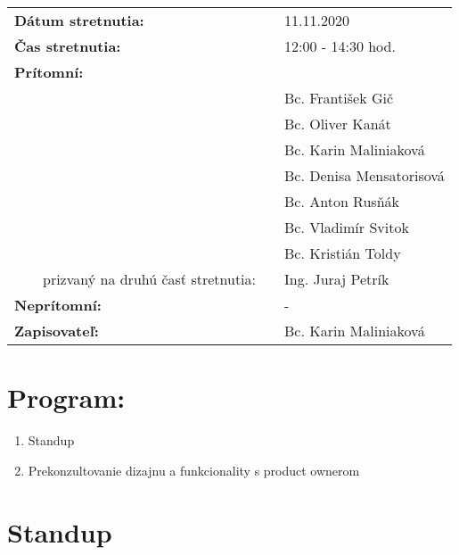 \documentclass{article}
\begin{document}
    

    \begin{table}[h]
        \begin{tabular}{lllll}
            \multicolumn{3}{l}{\textbf{Dátum stretnutia:}} & & 11.11.2020 \\
            \multicolumn{3}{l}{\textbf{Čas stretnutia:}} & & 12:00 - 14:30 hod. \\
            \multicolumn{3}{l}{\textbf{Prítomní:}} \\
            & & & & Bc. František Gič  \\
            & & & & Bc. Oliver Kanát \\
            & & & & Bc. Karin Maliniaková \\
            & & & & Bc. Denisa Mensatorisová \\
            & & & & Bc. Anton Rusňák \\
            & & & & Bc. Vladimír Svitok \\
            & & & & Bc. Kristián Toldy \\
            & & prizvaný na druhú časť stretnutia: & & Ing. Juraj Petrík \\
            \multicolumn{3}{l}{\textbf{Neprítomní:}} & & -\\
            \multicolumn{3}{l}{\textbf{Zapisovateľ:}} & & Bc. Karin Maliniaková \\
        \end{tabular}
        \label{tab:grades}
    \end{table}

    \section*{Program:}

    \begin{enumerate}
        \item Standup
        \item Prekonzultovanie dizajnu a funkcionality s product ownerom
    \end{enumerate}

    \section*{Standup}
\end{document}
